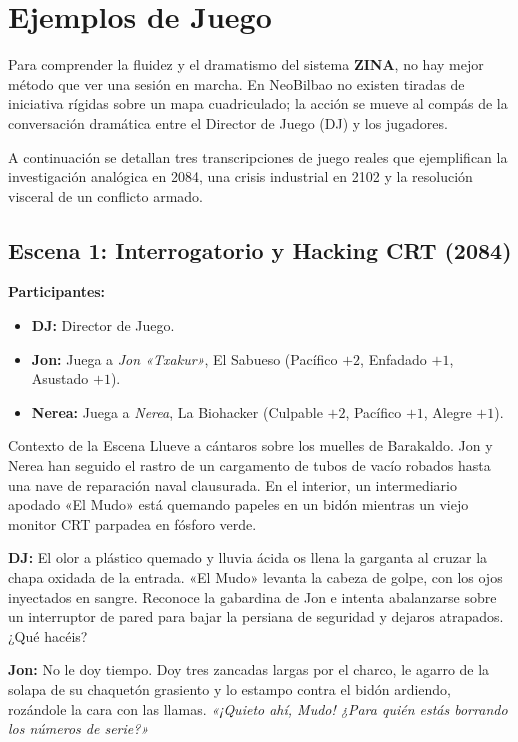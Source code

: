 \chapter{Ejemplos de Juego}

Para comprender la fluidez y el dramatismo del sistema \textbf{ZINA}, no hay mejor método que ver una sesión en marcha. En NeoBilbao no existen tiradas de iniciativa rígidas sobre un mapa cuadriculado; la acción se mueve al compás de la conversación dramática entre el Director de Juego (DJ) y los jugadores.

A continuación se detallan tres transcripciones de juego reales que ejemplifican la investigación analógica en 2084, una crisis industrial en 2102 y la resolución visceral de un conflicto armado.

\section{Escena 1: Interrogatorio y Hacking CRT (2084)}

\textbf{Participantes:}
\begin{itemize}
    \item \textbf{DJ:} Director de Juego.
    \item \textbf{Jon:} Juega a \textit{Jon «Txakur»}, El Sabueso (Pacífico $+2$, Enfadado $+1$, Asustado $+1$).
    \item \textbf{Nerea:} Juega a \textit{Nerea}, La Biohacker (Culpable $+2$, Pacífico $+1$, Alegre $+1$).
\end{itemize}

\begin{CajaAmbientacion}{Contexto de la Escena}
Llueve a cántaros sobre los muelles de Barakaldo. Jon y Nerea han seguido el rastro de un cargamento de tubos de vacío robados hasta una nave de reparación naval clausurada. En el interior, un intermediario apodado «El Mudo» está quemando papeles en un bidón mientras un viejo monitor CRT parpadea en fósforo verde.
\end{CajaAmbientacion}

\textbf{DJ:} El olor a plástico quemado y lluvia ácida os llena la garganta al cruzar la chapa oxidada de la entrada. «El Mudo» levanta la cabeza de golpe, con los ojos inyectados en sangre. Reconoce la gabardina de Jon e intenta abalanzarse sobre un interruptor de pared para bajar la persiana de seguridad y dejaros atrapados. ¿Qué hacéis?

\textbf{Jon:} No le doy tiempo. Doy tres zancadas largas por el charco, le agarro de la solapa de su chaquetón grasiento y lo estampo contra el bidón ardiendo, rozándole la cara con las llamas. \textit{«¡Quieto ahí, Mudo! ¿Para quién estás borrando los números de serie?»}

